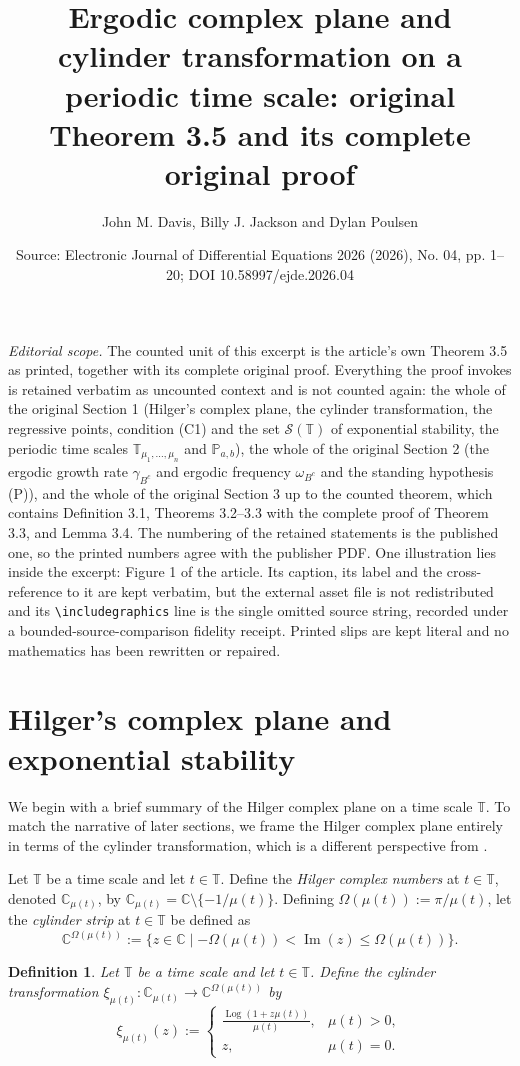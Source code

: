 \documentclass[10pt,a4paper]{amsart}
\title[Ergodic complex plane and cylinder transformation: original Theorem 3.5]{Ergodic complex plane and cylinder transformation on a periodic time scale: original Theorem 3.5 and its complete original proof}
\author{John M. Davis, Billy J. Jackson and Dylan Poulsen}
\date{Source: Electronic Journal of Differential Equations 2026 (2026), No. 04, pp. 1--20; DOI 10.58997/ejde.2026.04}
\DeclareMathOperator{\myIm}{Im}
\numberwithin{equation}{section}
\newtheorem{definition}[theorem]{Definition}
\begin{document}
\maketitle
\noindent\textit{Editorial scope.} The counted unit of this excerpt is the article's own Theorem 3.5 as printed, together with its complete original proof. Everything the proof invokes is retained verbatim as uncounted context and is not counted again: the whole of the original Section 1 (Hilger's complex plane, the cylinder transformation, the regressive points, condition (C1) and the set $\mathcal S(\mathbb T)$ of exponential stability, the periodic time scales $\mathbb T_{\mu_1,\dots,\mu_n}$ and $\mathbb P_{a,b}$), the whole of the original Section 2 (the ergodic growth rate $\gamma_{B^c}$ and ergodic frequency $\omega_{B^c}$ and the standing hypothesis (P)), and the whole of the original Section 3 up to the counted theorem, which contains Definition 3.1, Theorems 3.2--3.3 with the complete proof of Theorem 3.3, and Lemma 3.4. The numbering of the retained statements is the published one, so the printed numbers agree with the publisher PDF. One illustration lies inside the excerpt: Figure 1 of the article. Its caption, its label and the cross-reference to it are kept verbatim, but the external asset file is not redistributed and its \verb|\includegraphics| line is the single omitted source string, recorded under a bounded-source-comparison fidelity receipt. Printed slips are kept literal and no mathematics has been rewritten or repaired.
\section{Hilger's complex plane and exponential stability}

We begin with a brief summary of the Hilger complex plane \cite{BoPeD} on a time
scale $\mathbb{T}$. To match the narrative of later sections, we frame the Hilger
complex plane entirely in terms of the cylinder transformation, which is a different
perspective from \cite{BoPeD}.

Let $\mathbb{T}$ be a time scale and let $t \in \mathbb{T}$. Define the \emph{Hilger complex numbers}
at $t\in\mathbb{T}$, denoted $\mathbb{C}_{\mu(t)}$, by $\mathbb{C}_{\mu(t)} = \mathbb{C} \setminus \{-1/\mu(t)\}$. Defining $\Omega(\mu(t)) := \pi/\mu(t)$, let the \emph{cylinder strip} at $t\in\mathbb{T}$ be defined as
\[
\mathbb{C}^{\Omega(\mu(t))} := \{z \in \mathbb{C} \mid -\Omega(\mu(t)) < \myIm(z) \leq \Omega(\mu(t)) \}.
\]
\begin{definition} \rm
Let $\mathbb{T}$ be a time scale and let $t \in \mathbb{T}$. Define the
\emph{cylinder transformation} $\xi_{\mu(t)}:\mathbb{C}_{\mu(t)} \to \mathbb{C}^{\Omega(\mu(t))}$ by
 \begin{equation}\label{cyl}
 \xi_{\mu(t)}(z):=
 \begin{cases}
 \frac{\operatorname{Log}(1+z \mu(t))}{\mu(t)}, & \mu(t)>0,\\
 z, & \mu(t)=0.
 \end{cases}
 \end{equation}
\end{definition}
\end{document}
